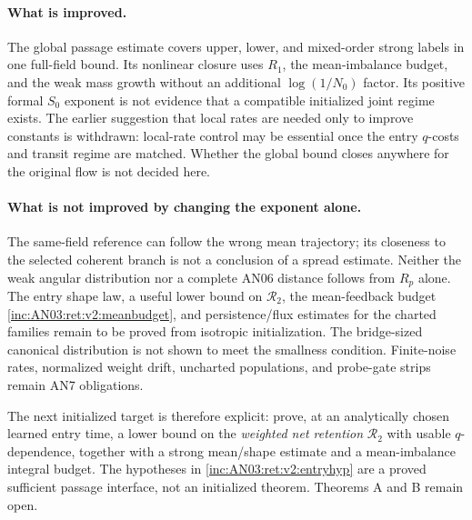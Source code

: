 \documentclass[11pt]{article}
\numberwithin{equation}{section}
\theoremstyle{remark}\newtheorem{remark}[theorem]{Remark}
\newcommand{\1}{\mathbf 1}
\begin{document}
\paragraph{What is improved.}
The global passage estimate covers upper, lower, and mixed-order strong
labels in one full-field bound. Its nonlinear closure uses $R_1$, the
mean-imbalance budget, and the weak mass growth without an additional
$\log(1/N_0)$ factor. Its positive formal $S_0$ exponent is not evidence
that a compatible initialized joint regime exists. The earlier suggestion
that local rates are needed only to improve constants is withdrawn:
local-rate control may be essential once the entry $q$-costs and transit
regime are matched. Whether the global bound closes anywhere for the
original flow is not decided here.

\paragraph{What is not improved by changing the exponent alone.}
The same-field reference can follow the wrong mean trajectory; its
closeness to the selected coherent branch is not a conclusion of a
spread estimate. Neither the weak angular distribution nor a complete
AN06 distance follows from $R_p$ alone. The entry shape law, a useful
lower bound on $\mathcal R_2$, the mean-feedback budget
\eqref{inc:AN03:ret:v2:meanbudget}, and persistence/flux estimates for the
charted families remain to be proved from isotropic initialization.
The bridge-sized canonical distribution is not shown to meet the
smallness condition. Finite-noise rates, normalized weight drift,
uncharted populations, and probe-gate strips remain AN7 obligations.

The next initialized target is therefore explicit: prove, at an
analytically chosen learned entry time, a lower bound on the
\emph{weighted net retention} $\mathcal R_2$ with usable $q$-dependence,
together with a strong mean/shape estimate and a mean-imbalance integral
budget. The hypotheses in \eqref{inc:AN03:ret:v2:entryhyp} are a proved
sufficient passage interface, not an initialized theorem. Theorems A
and B remain open.
\end{document}
